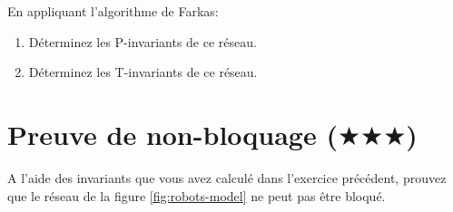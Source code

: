\documentclass[a4paper, titlepage]{article}
\numberwithin{figure}{section}
\numberwithin{table}{section}
\begin{document}
En appliquant l'algorithme de Farkas:
\begin{enumerate}
  \item Déterminez les P-invariants de ce réseau.
  \item Déterminez les T-invariants de ce réseau.
\end{enumerate}

\section{Preuve de non-bloquage ($\bigstar\bigstar\bigstar$)}

A l'aide des invariants que vous avez calculé dans l'exercice précédent, prouvez que le réseau de la figure \ref{fig:robots-model} ne peut pas être bloqué.
\end{document}
